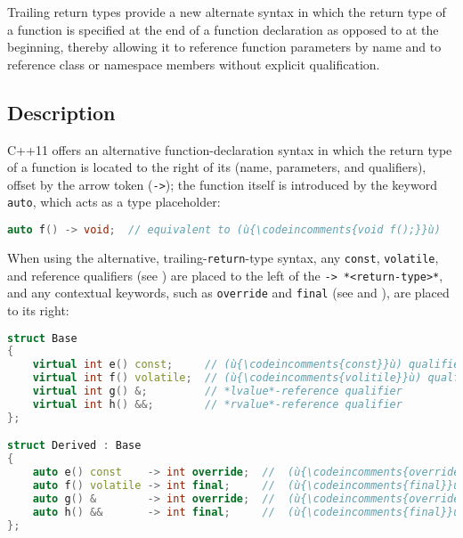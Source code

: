 
Trailing return types provide a new alternate syntax in which the return type of a function is specified at
the end of a function declaration as opposed to at the beginning,
thereby allowing it to reference function parameters by name and to reference class
or namespace members without explicit qualification.

\subsection[Description]{Description}\label{description}

C++11 offers an alternative function-declaration syntax in which the
return type of a function is located to the right of its
 (name, parameters, and qualifiers), offset by the
arrow token (\lstinline!->!); the function itself is introduced by the
keyword \lstinline!auto!, which acts as a type placeholder:
%

\begin{lstlisting}[language=C++]
auto f() -> void;  // equivalent to (ù{\codeincomments{void f();}}ù)
\end{lstlisting}
    
When using the alternative, trailing-\lstinline!return!-type syntax, any \lstinline!const!,
\lstinline!volatile!, and reference qualifiers (see 
) are placed to the left of 
the \lstinline!->!~\lstinline!*<return-type>*!, and any contextual keywords, such as
\lstinline!override! and \lstinline!final! (see 
and 
), are placed to its right:

\begin{lstlisting}[language=C++]
struct Base
{
    virtual int e() const;     // (ù{\codeincomments{const}}ù) qualifier
    virtual int f() volatile;  // (ù{\codeincomments{volitile}}ù) qualfier
    virtual int g() &;         // *lvalue*-reference qualifier
    virtual int h() &&;        // *rvalue*-reference qualifier
};

struct Derived : Base
{
    auto e() const    -> int override;  //  (ù{\codeincomments{override}}ù) contextual keyword
    auto f() volatile -> int final;     //  (ù{\codeincomments{final}}ù)         "        "
    auto g() &        -> int override;  //  (ù{\codeincomments{override}}ù)      "        "
    auto h() &&       -> int final;     //  (ù{\codeincomments{final}}ù)         "        "
};
\end{lstlisting}

